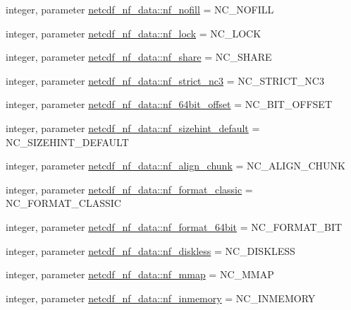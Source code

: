 \begin{DoxyCompactItemize}
\item 
integer, parameter \hyperlink{namespacenetcdf__nf__data_aab3e7634197ed5d40c4710579d794c98}{netcdf\+\_\+nf\+\_\+data\+::nf\+\_\+nofill} = N\+C\+\_\+\+N\+O\+F\+I\+LL
\item 
integer, parameter \hyperlink{namespacenetcdf__nf__data_aa22cfb535bd1e4b604b4611112df9db9}{netcdf\+\_\+nf\+\_\+data\+::nf\+\_\+lock} = N\+C\+\_\+\+L\+O\+CK
\item 
integer, parameter \hyperlink{namespacenetcdf__nf__data_a2670fde546ed052a821c507ed5beef88}{netcdf\+\_\+nf\+\_\+data\+::nf\+\_\+share} = N\+C\+\_\+\+S\+H\+A\+RE
\item 
integer, parameter \hyperlink{namespacenetcdf__nf__data_a06091f799fafc66bce2118228c404f14}{netcdf\+\_\+nf\+\_\+data\+::nf\+\_\+strict\+\_\+nc3} = N\+C\+\_\+\+S\+T\+R\+I\+C\+T\+\_\+\+N\+C3
\item 
integer, parameter \hyperlink{namespacenetcdf__nf__data_a6245127b1df81b4bc56f354a0b982950}{netcdf\+\_\+nf\+\_\+data\+::nf\+\_\+64bit\+\_\+offset} = N\+C\+\_\+B\+I\+T\+\_\+\+O\+F\+F\+S\+ET
\item 
integer, parameter \hyperlink{namespacenetcdf__nf__data_a7b4a147f447c929c8e420751c575a4e8}{netcdf\+\_\+nf\+\_\+data\+::nf\+\_\+sizehint\+\_\+default} = N\+C\+\_\+\+S\+I\+Z\+E\+H\+I\+N\+T\+\_\+\+D\+E\+F\+A\+U\+LT
\item 
integer, parameter \hyperlink{namespacenetcdf__nf__data_a3220c3336396ea4bb888b530dc5aa009}{netcdf\+\_\+nf\+\_\+data\+::nf\+\_\+align\+\_\+chunk} = N\+C\+\_\+\+A\+L\+I\+G\+N\+\_\+\+C\+H\+U\+NK
\item 
integer, parameter \hyperlink{namespacenetcdf__nf__data_a449d876734b1500d1735d797718432ed}{netcdf\+\_\+nf\+\_\+data\+::nf\+\_\+format\+\_\+classic} = N\+C\+\_\+\+F\+O\+R\+M\+A\+T\+\_\+\+C\+L\+A\+S\+S\+IC
\item 
integer, parameter \hyperlink{namespacenetcdf__nf__data_aab99eafbfed8bb22a4e07b300eec8ffe}{netcdf\+\_\+nf\+\_\+data\+::nf\+\_\+format\+\_\+64bit} = N\+C\+\_\+\+F\+O\+R\+M\+A\+T\+\_\+B\+IT
\item 
integer, parameter \hyperlink{namespacenetcdf__nf__data_a0c93b5fc2e40ce8d75e94f1ad2638b80}{netcdf\+\_\+nf\+\_\+data\+::nf\+\_\+diskless} = N\+C\+\_\+\+D\+I\+S\+K\+L\+E\+SS
\item 
integer, parameter \hyperlink{namespacenetcdf__nf__data_a7a6fa120e092e81460a00d740d306edf}{netcdf\+\_\+nf\+\_\+data\+::nf\+\_\+mmap} = N\+C\+\_\+\+M\+M\+AP
\item 
integer, parameter \hyperlink{namespacenetcdf__nf__data_ae1df4cb46d9c0b94386f1c6a32d57b76}{netcdf\+\_\+nf\+\_\+data\+::nf\+\_\+inmemory} = N\+C\+\_\+\+I\+N\+M\+E\+M\+O\+RY

\end{DoxyCompactItemize}
